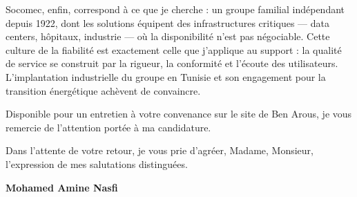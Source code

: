 \documentclass[11pt,a4paper]{article}
\begin{document}
Socomec, enfin, correspond à ce que je cherche : un groupe familial indépendant depuis 1922, dont les solutions équipent des infrastructures critiques — data centers, hôpitaux, industrie — où la disponibilité n'est pas négociable. Cette culture de la fiabilité est exactement celle que j'applique au support : la qualité de service se construit par la rigueur, la conformité et l'écoute des utilisateurs. L'implantation industrielle du groupe en Tunisie et son engagement pour la transition énergétique achèvent de convaincre.

Disponible pour un entretien à votre convenance sur le site de Ben Arous, je vous remercie de l'attention portée à ma candidature.

Dans l'attente de votre retour, je vous prie d'agréer, Madame, Monsieur, l'expression de mes salutations distinguées.

\vspace{14pt}
\hfill \textbf{Mohamed Amine Nasfi}
\end{document}
